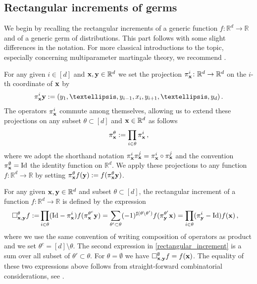 \documentclass[12pt]{article}
\numberwithin{equation}{section}
\theoremstyle{plain}
\theoremstyle{definition}
\newcommand{\R}{\ensuremath{{\mathbb R}}}
\newcommand{\Id}{\mbox{Id}}
\def\fy{\mathbf y}\def\fz{\mathbf z}
\begin{document}
\subsection{Rectangular increments of germs}
We begin by recalling the rectangular increments of a generic function $f\colon \R^d\to \R$ and of a generic germ of distributions. This part follows \cite{multiparameterStochSewing,harang21} with some slight differences in the notation. For more classical introductions to the topic, especially concerning multiparameter martingale theory, we recommend \cite{Khoshnevisan02,Cairoli1975}.

For any given $i\in  [d]$ and $\fx,\fy\in\R^d$ we set the projection $\pi^i_{\fx}\colon \R^d\to \R^d$ on the $i$-th coordinate of $\mathbf x$ by
\begin{equation*}
    \pi^i_{\fx} \fy := (y_1,\dots, y_{i-1}, x_i, y_{i+1},\dots, y_d)\,.
\end{equation*}
The operators $\pi^i_{\mathbf x}$ commute among themselves, allowing us to extend these projections on any subset $\theta\subset[d]$ and $ \fx\in \R^d$ as follows  
\begin{equation}\label{eq:projectionDef}
\pi^{\theta}_{\fx}:= \prod_{i\in\theta} \pi^i_{\fx}\,,
\end{equation}
where we adopt the shorthand notation $\pi^i_{\mathbf x}\pi^j_{\mathbf x}=\pi^i_{\mathbf x}\circ \pi^j_{\mathbf x} $ and the convention $\pi^{\emptyset}_{\mathbf x}=\text{Id}$ the identity function on $\R^d$. We apply these projections to any function $f\colon \R^d\to \R$ by setting  
$\pi^{\theta}_{\fx}f(\fy):= f(\pi^{\theta}_{\fx}\fy)$.



For any given $\fx,\fy\in\R^d$ and subset $\theta\subset [d]$, the rectangular increment of a function $f\colon \R^d\to \R$ is defined by the expression
\begin{align}\label{rectangular_increment}
\square_{\fx,\fy}^\theta f :=&\prod_{i\in\theta}(\text{Id} - \pi^i_{\fx})f(\pi^{\theta^c}_{\fx}\fy) = \sum_{\theta'\subset\theta} (-1)^{\sharp(\theta\setminus\theta')} f(\pi^{\theta'}_{\fy}\fx)
= \prod_{i\in\theta}(\pi^i_\fy - \Id)f(\fx)\,, 
\end{align}
where we use the same convention of writing composition of operators as product and we set  $\theta^c= [d]\setminus \theta$. The second expression in \eqref{rectangular_increment} is a sum over all subset of $\theta'\subset \theta $. For $\theta= \emptyset$ we have $\square_{\fx,\fy}^\emptyset f= f(\fx)$. The equality  of these two expressions above follows from straight-forward combinatorial considerations, see  \cite[Definition 1]{harang21}.
\end{document}
